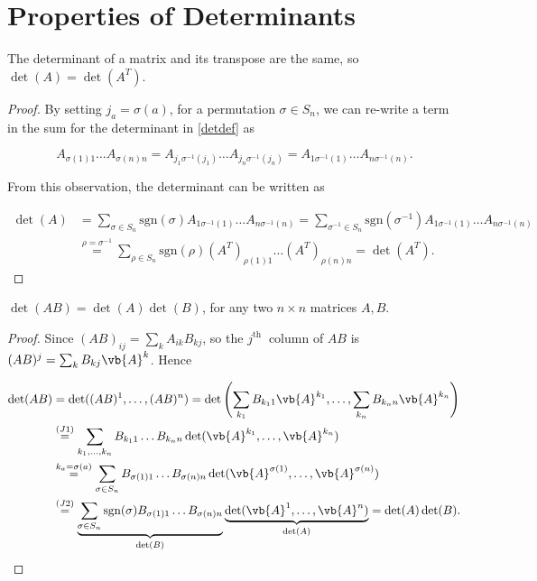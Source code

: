 \documentclass[a4paper,12pt]{report}
\begin{document}
\section{Properties of Determinants} \label{detprop} 

\begin{lemma}
The determinant of a matrix and its transpose are the same, so $\det(A) = \det(A^T)$.
\end{lemma}

\begin{proof}
By setting $j_a = \sigma(a)$, for a permutation $\sigma \in S_n$, we can re-write a term in the sum for the determinant in \cref{detdef} as 

\begin{equation}
A_{\sigma(1)1} \ldots A_{\sigma(n)n} = A_{j_1\sigma^{-1}(j_1)} \ldots A_{j_n\sigma^{-1}(j_n)} = A_{1\sigma^{-1}(1)} \ldots A_{n\sigma^{-1}(n)}.
\end{equation}

From this observation, the determinant can be written as

\begin{equation}
\begin{aligned}
\det(A) &= \sum_{\sigma \in S_n} \text{sgn}(\sigma) A_{1\sigma^{-1}(1)} \ldots A_{n\sigma^{-1}(n)} = \sum_{\sigma^{-1} \in S_n} \text{sgn}(\sigma^{-1}) A_{1\sigma^{-1}(1)} \ldots A_{n\sigma^{-1}(n)} \\
&\overset{\rho = \sigma^{-1}}{=} \sum_{\rho \in S_n} \text{sgn}(\rho) (A^T)_{\rho(1)1} \ldots (A^T)_{\rho(n)n} = \det(A^T).
\end{aligned}
\end{equation}
\end{proof}

\begin{theorem}
\(\det (AB) = \det (A) \det (B)\), for any two \(n \times  n\) matrices \(A, B\).   
\end{theorem}

\begin{proof}
Since \((AB)_{ij} = \sum_{k}^{} A_{ik}B_{kj}   \), so the \(j^{\text{th }} \) column of \(AB\) is \((AB)^{j} = \sum_{k}^{} B_{kj}\vb{A} ^{k}\). Hence

\begin{equation}
    \begin{aligned}
    \det(AB) &= \det((AB)^1, \ldots, (AB)^n) = \det\left(\sum_{k_1} B_{k_1 1} \vb{A} ^{k_1}, \ldots, \sum_{k_n} B_{k_n n} \vb{A} ^{k_n}\right) \\
    &\overset{(J1)}{=} \sum_{k_1, \ldots, k_n} B_{k_1 1} \ldots B_{k_n n} \det(\vb{A} ^{k_1}, \ldots, \vb{A} ^{k_n}) \\
    &\overset{k_a = \sigma(a)}{=} \sum_{\sigma \in S_n} B_{\sigma(1)1} \ldots B_{\sigma(n)n} \det(\vb{A} ^{\sigma(1)}, \ldots, \vb{A} ^{\sigma(n)}) \\
    &\overset{(J2)}{=} \underbrace{\sum_{\sigma \in S_n} \operatorname{sgn}(\sigma) B_{\sigma(1)1} \ldots B_{\sigma(n)n}}_{\det (B)} \underbrace{\det(\vb{A} ^1, \ldots, \vb{A} ^n)}_{\det(A)} = \det(A) \det(B).
    \end{aligned}
\end{equation}
\end{proof}
\end{document}
